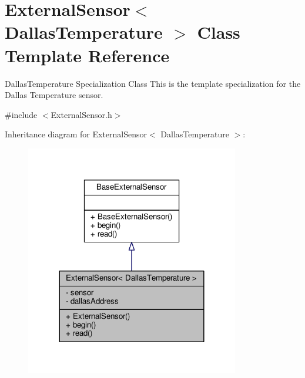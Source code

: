 \hypertarget{classExternalSensor_3_01DallasTemperature_01_4}{}\section{External\+Sensor$<$ Dallas\+Temperature $>$ Class Template Reference}
\label{classExternalSensor_3_01DallasTemperature_01_4}


Dallas\+Temperature Specialization Class This is the template specialization for the Dallas Temperature sensor.  




{\ttfamily \#include $<$External\+Sensor.\+h$>$}



Inheritance diagram for External\+Sensor$<$ Dallas\+Temperature $>$\+:\nopagebreak
\begin{figure}[H]
\begin{center}
\leavevmode
\includegraphics[width=264pt]{classExternalSensor_3_01DallasTemperature_01_4__inherit__graph}
\end{center}
\end{figure}


